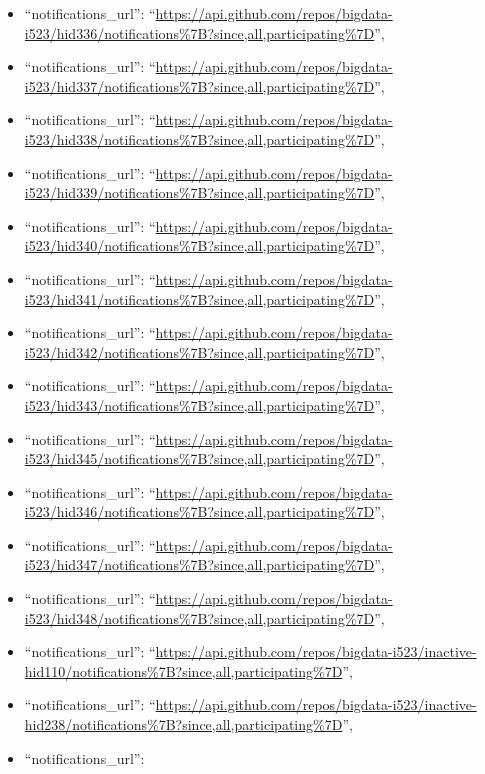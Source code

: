 \begin{itemize}
\item
  ``notifications\_url'':
  ``\url{https://api.github.com/repos/bigdata-i523/hid336/notifications\%7B?since,all,participating\%7D}'',
\item
  ``notifications\_url'':
  ``\url{https://api.github.com/repos/bigdata-i523/hid337/notifications\%7B?since,all,participating\%7D}'',
\item
  ``notifications\_url'':
  ``\url{https://api.github.com/repos/bigdata-i523/hid338/notifications\%7B?since,all,participating\%7D}'',
\item
  ``notifications\_url'':
  ``\url{https://api.github.com/repos/bigdata-i523/hid339/notifications\%7B?since,all,participating\%7D}'',
\item
  ``notifications\_url'':
  ``\url{https://api.github.com/repos/bigdata-i523/hid340/notifications\%7B?since,all,participating\%7D}'',
\item
  ``notifications\_url'':
  ``\url{https://api.github.com/repos/bigdata-i523/hid341/notifications\%7B?since,all,participating\%7D}'',
\item
  ``notifications\_url'':
  ``\url{https://api.github.com/repos/bigdata-i523/hid342/notifications\%7B?since,all,participating\%7D}'',
\item
  ``notifications\_url'':
  ``\url{https://api.github.com/repos/bigdata-i523/hid343/notifications\%7B?since,all,participating\%7D}'',
\item
  ``notifications\_url'':
  ``\url{https://api.github.com/repos/bigdata-i523/hid345/notifications\%7B?since,all,participating\%7D}'',
\item
  ``notifications\_url'':
  ``\url{https://api.github.com/repos/bigdata-i523/hid346/notifications\%7B?since,all,participating\%7D}'',
\item
  ``notifications\_url'':
  ``\url{https://api.github.com/repos/bigdata-i523/hid347/notifications\%7B?since,all,participating\%7D}'',
\item
  ``notifications\_url'':
  ``\url{https://api.github.com/repos/bigdata-i523/hid348/notifications\%7B?since,all,participating\%7D}'',
\item
  ``notifications\_url'':
  ``\url{https://api.github.com/repos/bigdata-i523/inactive-hid110/notifications\%7B?since,all,participating\%7D}'',
\item
  ``notifications\_url'':
  ``\url{https://api.github.com/repos/bigdata-i523/inactive-hid238/notifications\%7B?since,all,participating\%7D}'',
\item
  ``notifications\_url'':

\end{itemize}
